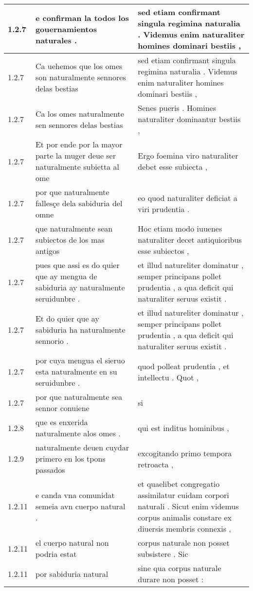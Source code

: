 \begin{tabular}{|p{1cm}|p{6.5cm}|p{6.5cm}|}
1.2.7 & e confirman la todos los gouernamientos naturales . & sed etiam confirmant singula regimina naturalia . Videmus enim naturaliter homines dominari bestiis , \\\hline
1.2.7 & Ca uehemos que los omes son naturalmente sennores delas bestias & sed etiam confirmant singula regimina naturalia . Videmus enim naturaliter homines dominari bestiis , \\\hline
1.2.7 & Ca los omes naturalmente sen sennores delas bestias & Senes pueris . Homines naturaliter dominantur bestiis , \\\hline
1.2.7 & Et por ende por la mayor parte la muger deue ser naturalmente subietta al ome & Ergo foemina viro naturaliter debet esse subiecta , \\\hline
1.2.7 & por que naturalmente fallesçe dela sabiduria del omne & eo quod naturaliter deficiat a viri prudentia . \\\hline
1.2.7 & que naturalmente sean subiectos de los mas antigos & Hoc etiam modo iuuenes naturaliter decet antiquioribus esse subiectos , \\\hline
1.2.7 & pues que assi es do quier que ay mengua de sabiduria ay naturalmente seruidunbre . & et illud natureliter dominatur , semper principans pollet prudentia , a qua deficit qui naturaliter seruus existit . \\\hline
1.2.7 & Et do quier que ay sabiduria ha naturalmente sennorio . & et illud natureliter dominatur , semper principans pollet prudentia , a qua deficit qui naturaliter seruus existit . \\\hline
1.2.7 & por cuya mengua el sieruo esta naturalmente en su seruidunbre . & quod polleat prudentia , et intellectu . Quot , \\\hline
1.2.7 & por que naturalmente sea sennor conuiene & si \\\hline
1.2.8 & que es enxerida naturalmente alos omes . & qui est inditus hominibus , \\\hline
1.2.9 & naturalmente deuen cuydar primero en los tpons passados & excogitando primo tempora retroacta , \\\hline
1.2.11 & e canda vna comunidat semeia avn cuerpo natural . & et quaelibet congregatio assimilatur cuidam corpori naturali . Sicut enim videmus corpus animalis constare ex diuersis membris connexis , \\\hline
1.2.11 & el cuerpo natural non podria estat & corpus naturale non posset subsistere . Sic \\\hline
1.2.11 & por sabiduria natural & sine qua corpus naturale durare non posset : \\\hline

\end{tabular}
